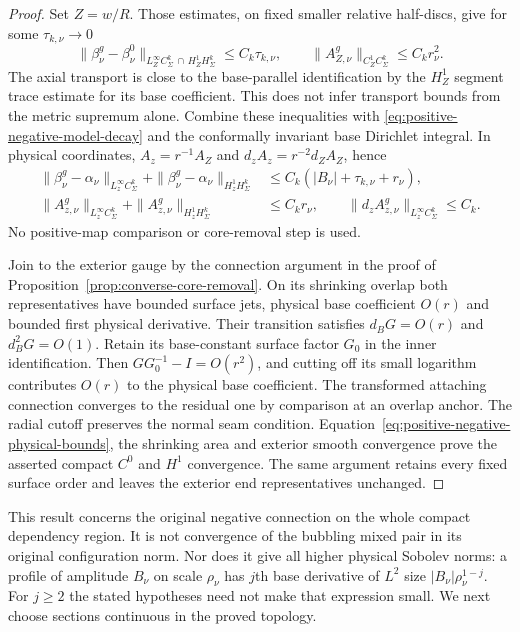 \documentclass[11pt]{amsart}
\theoremstyle{definition}
\theoremstyle{remark}
\theoremstyle{plain}
\begin{document}
\begin{proof}
Set $Z=w/R$. Those estimates, on fixed smaller relative
half-discs, give for some $\tau_{k,\nu}\to0$
\[
 \|\beta_\nu^g-\beta_\nu^0\|_{L_Z^\infty C_\Sigma^k
                                     \,\cap\,H_Z^1H_\Sigma^k}
       \leq C_k\tau_{k,\nu},\qquad
 \|A_{Z,\nu}^g\|_{C_Z^1C_\Sigma^k}\leq C_kr_\nu^2.
\]
The axial transport is close to the base-parallel identification
by the $H_Z^1$ segment trace estimate for its base coefficient.
This does not infer transport bounds from the metric supremum alone.
Combine these inequalities with
\eqref{eq:positive-negative-model-decay} and the conformally
invariant base Dirichlet integral. In physical coordinates,
$A_z=r^{-1}A_Z$ and $d_zA_z=r^{-2}d_ZA_Z$, hence
\begin{equation}\label{eq:positive-negative-physical-bounds}
\begin{split}
 \|\beta_\nu^g-\alpha_\nu\|_{L_z^\infty C_\Sigma^k}
       +\|\beta_\nu^g-\alpha_\nu\|_{H_z^1H_\Sigma^k}
       &\leq C_k(|B_\nu|+\tau_{k,\nu}+r_\nu),\\
 \|A_{z,\nu}^g\|_{L_z^\infty C_\Sigma^k}
       +\|A_{z,\nu}^g\|_{H_z^1H_\Sigma^k}
       &\leq C_kr_\nu,\qquad
 \|d_zA_{z,\nu}^g\|_{L_z^\infty C_\Sigma^k}\leq C_k.
\end{split}
\end{equation}
No positive-map comparison or core-removal step is used.

Join to the exterior gauge by the connection argument in the
proof of Proposition~\ref{prop:converse-core-removal}.
On its shrinking overlap both representatives have bounded
surface jets, physical base coefficient $O(r)$ and bounded
first physical derivative. Their transition satisfies
$d_BG=O(r)$ and $d_B^2G=O(1)$.
Retain its base-constant surface factor $G_0$ in the inner
identification. Then $GG_0^{-1}-I=O(r^2)$, and cutting off
its small logarithm contributes $O(r)$ to the physical base
coefficient. The transformed attaching connection converges
to the residual one by comparison at an overlap anchor.
The radial cutoff preserves the normal seam condition.
Equation~\eqref{eq:positive-negative-physical-bounds}, the
shrinking area and exterior smooth convergence prove the
asserted compact $C^0$ and $H^1$ convergence. The same
argument retains every fixed surface order and leaves the
exterior end representatives unchanged.
\end{proof}

This result concerns the original negative connection on the
whole compact dependency region. It is not convergence of the
bubbling mixed pair in its original configuration norm.
Nor does it give all higher physical Sobolev norms: a profile
of amplitude $B_\nu$ on scale $\rho_\nu$ has $j$th base
derivative of $L^2$ size $|B_\nu|\rho_\nu^{1-j}$.
For $j\geq2$ the stated hypotheses need not make that expression
small. We next choose sections continuous in the proved topology.
\end{document}
